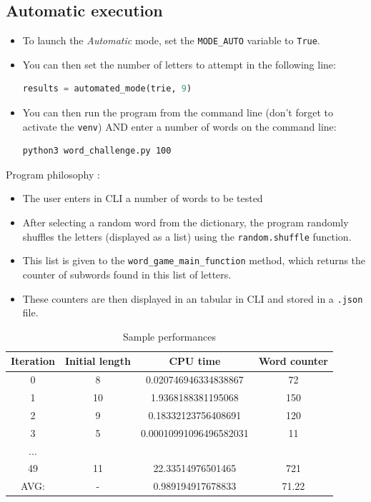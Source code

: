 \documentclass[10pt,a4paper,hidelinks]{article}
\begin{document}
\subsection{Automatic execution}
\begin{itemize}
    \item To launch the \textit{Automatic} mode, set the \verb|MODE_AUTO| variable to \verb|True|.
    \item You can then set the number of letters to attempt in the following line:
\begin{lstlisting}[language=Python]
results = automated_mode(trie, 9)
\end{lstlisting}

    \item You can then run the program from the command line (don't forget to activate the \verb|venv|) AND enter a number of words on the command line:
\begin{lstlisting}[language=Bash]
python3 word_challenge.py 100
\end{lstlisting}
\end{itemize}
Program philosophy :
\begin{itemize}
    \item The user enters in CLI a number of words to be tested
    \item After selecting a random word from the dictionary, the program randomly shuffles the letters (displayed as a list) using the \verb|random.shuffle| function.
    \item This list is given to the \verb|word_game_main_function| method, which returns the counter of subwords found in this list of letters.
    \item These counters are then displayed in an tabular in CLI and stored in a \verb|.json| file.
\end{itemize}

\begin{table}[!ht]
    \centering
    \begin{tabular}{|c|c|c|c|}
        \hline
        Iteration & Initial length & CPU time & Word counter \\ \hline
        0 & 8 & 0.020746946334838867 & 72 \\ 
        1 & 10 & 1.9368188381195068 & 150 \\
        2 & 9 & 0.18332123756408691 & 120 \\ 
        3 & 5 & 0.00010991096496582031 & 11 \\ 
        ... & ~ & ~ & ~ \\ 
        49 & 11 & 22.33514976501465 & 721 \\ 
        \hline
        \hline
        AVG: & - & 0.989194917678833 & 71.22 \\ 
        \hline
    \end{tabular}
    \caption{Sample performances}
\end{table}
\end{document}
